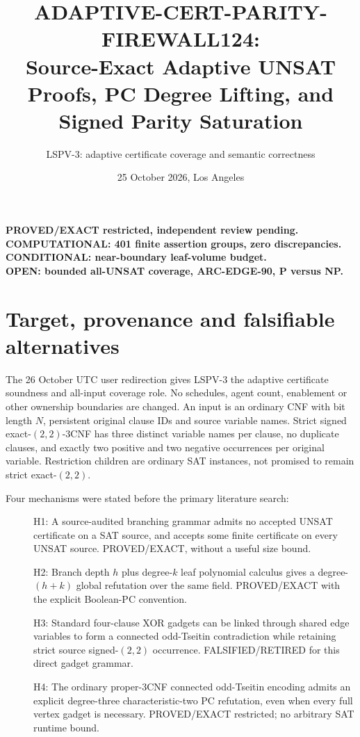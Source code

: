 \documentclass[11pt]{article}
\title{ADAPTIVE-CERT-PARITY-FIREWALL124:\\
Source-Exact Adaptive UNSAT Proofs, PC Degree Lifting, and Signed Parity Saturation}
\author{LSPV-3: adaptive certificate coverage and semantic correctness}
\date{25 October 2026, Los Angeles}
\begin{document}
\maketitle
\begin{center}
\textbf{PROVED/EXACT restricted, independent review pending.}\\
\textbf{COMPUTATIONAL: 401 finite assertion groups, zero discrepancies.}\\
\textbf{CONDITIONAL: near-boundary leaf-volume budget.}\\
\textbf{OPEN: bounded all-UNSAT coverage, ARC-EDGE-90, P versus NP.}
\end{center}

\section{Target, provenance and falsifiable alternatives}
The 26 October UTC user redirection gives LSPV-3 the adaptive certificate
soundness and all-input coverage role. No schedules, agent count, enablement
or other ownership boundaries are changed. An input is an ordinary CNF
with bit length $N$, persistent original clause IDs and source variable
names. Strict signed exact-$(2,2)$-3CNF has three distinct variable names
per clause, no duplicate clauses, and exactly two positive and two
negative occurrences per original variable. Restriction children are
ordinary SAT instances, not promised to remain strict exact-$(2,2)$.

Four mechanisms were stated before the primary literature search:
\begin{description}
\item[] H1: A source-audited branching grammar admits no accepted
UNSAT certificate on a SAT source, and accepts some finite certificate
on every UNSAT source. PROVED/EXACT, without a useful size bound.
\item[] H2: Branch depth $h$ plus degree-$k$ leaf polynomial calculus
gives a degree-$(h+k)$ global refutation over the same field.
PROVED/EXACT with the explicit Boolean-PC convention.
\item[] H3: Standard four-clause XOR gadgets can be linked through
shared edge variables to form a connected odd-Tseitin contradiction
while retaining strict source signed-$(2,2)$ occurrence.
FALSIFIED/RETIRED for this direct gadget grammar.
\item[] H4: The ordinary proper-3CNF connected odd-Tseitin encoding
admits an explicit degree-three characteristic-two PC refutation,
even when every full vertex gadget is necessary.
PROVED/EXACT restricted; no arbitrary SAT runtime bound.
\end{description}
\end{document}
